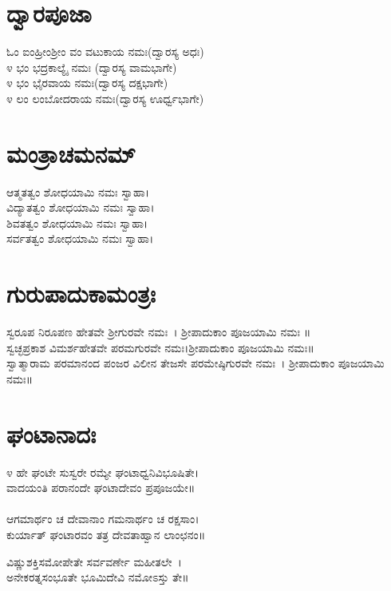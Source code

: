 \section{ದ್ವಾರಪೂಜಾ}
ಓಂ ಐಂಹ್ರೀಂಶ್ರೀಂ ವಂ ವಟುಕಾಯ ನಮಃ(ದ್ವಾರಸ್ಯ ಅಧಃ)\\
೪ ಭಂ ಭದ್ರಕಾಲ್ಯೈ ನಮಃ (ದ್ವಾರಸ್ಯ ವಾಮಭಾಗೇ)\\
೪ ಭಂ ಭೈರವಾಯ ನಮಃ(ದ್ವಾರಸ್ಯ ದಕ್ಷಭಾಗೇ)\\
೪ ಲಂ ಲಂಬೋದರಾಯ ನಮಃ(ದ್ವಾರಸ್ಯ ಊರ್ಧ್ವಭಾಗೇ)
\section{ಮಂತ್ರಾಚಮನಮ್}
 ಆತ್ಮತತ್ವಂ ಶೋಧಯಾಮಿ ನಮಃ ಸ್ವಾಹಾ।\\
 ವಿದ್ಯಾತತ್ವಂ ಶೋಧಯಾಮಿ ನಮಃ ಸ್ವಾಹಾ।\\
 ಶಿವತತ್ವಂ ಶೋಧಯಾಮಿ ನಮಃ ಸ್ವಾಹಾ।\\
 ಸರ್ವತತ್ವಂ ಶೋಧಯಾಮಿ ನಮಃ ಸ್ವಾಹಾ।
\section{ಗುರುಪಾದುಕಾಮಂತ್ರಃ}
 ಸ್ವರೂಪ ನಿರೂಪಣ ಹೇತವೇ ಶ್ರೀಗುರವೇ ನಮಃ~। ಶ್ರೀಪಾದುಕಾಂ ಪೂಜಯಾಮಿ ನಮಃ ॥\\
 ಸ್ವಚ್ಛಪ್ರಕಾಶ ವಿಮರ್ಶಹೇತವೇ ಪರಮಗುರವೇ ನಮಃ।ಶ್ರೀಪಾದುಕಾಂ ಪೂಜಯಾಮಿ ನಮಃ॥\\
 ಸ್ವಾತ್ಮಾರಾಮ ಪರಮಾನಂದ ಪಂಜರ ವಿಲೀನ ತೇಜಸೇ ಪರಮೇಷ್ಠಿಗುರವೇ ನಮಃ~। ಶ್ರೀಪಾದುಕಾಂ ಪೂಜಯಾಮಿ ನಮಃ॥
\section{ಘಂಟಾನಾದಃ}
೪ ಹೇ ಘಂಟೇ ಸುಸ್ವರೇ ರಮ್ಯೇ ಘಂಟಾಧ್ವನಿವಿಭೂಷಿತೇ।\\
ವಾದಯಂತಿ ಪರಾನಂದೇ ಘಂಟಾದೇವಂ ಪ್ರಪೂಜಯೇ॥\\
\\
ಆಗಮಾರ್ಥಂ ಚ ದೇವಾನಾಂ ಗಮನಾರ್ಥಂ ಚ ರಕ್ಷಸಾಂ।\\
ಕುರ್ಯಾತ್ ಘಂಟಾರವಂ ತತ್ರ ದೇವತಾಹ್ವಾನ ಲಾಂಛನಂ॥

ವಿಷ್ಣುಶಕ್ತಿಸಮೋಪೇತೇ ಸರ್ವವರ್ಣೇ ಮಹೀತಲೇ~।\\
ಅನೇಕರತ್ನಸಂಭೂತೇ ಭೂಮಿದೇವಿ ನಮೋಽಸ್ತು ತೇ॥

